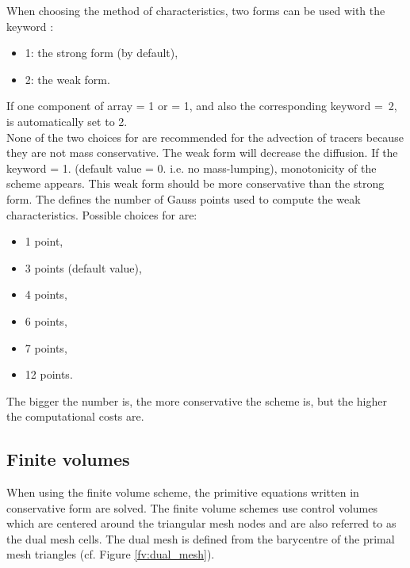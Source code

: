 When choosing the method of characteristics, two forms can be used with the
keyword :

\begin{itemize}
\item 1: the strong form (by default),
\item 2: the weak form.
\end{itemize}

If one component of array  = 1 or
 = 1,
and also the corresponding keyword
 =~2,
 is automatically set to 2.\\

None of the two choices for 
are recommended for the advection of tracers because they are not
mass conservative. The weak form will decrease the diffusion. If the keyword
 = 1. (default value = 0. i.e. no
mass-lumping), monotonicity of the scheme appears. This weak form should be
more conservative than the strong form. The  defines the number of Gauss points used to compute the
weak characteristics.
Possible choices for  are:
\begin{itemize}
\item 1 point,
\item 3 points (default value),
\item 4 points,
\item 6 points,
\item 7 points,
\item 12 points.
\end{itemize}
The bigger the number is, the more conservative the scheme is, but the higher the
computational costs are.

\subsection{Finite volumes}

When using the finite volume scheme, the primitive equations written
in conservative form are solved. The finite volume schemes use control volumes
which are centered around the triangular mesh nodes and are also referred to as
the dual mesh cells. The dual mesh is defined from
the barycentre of the primal mesh triangles (cf. Figure \ref{fv:dual_mesh}).

